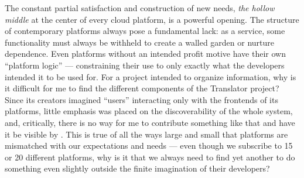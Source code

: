 The constant partial satisfaction and construction of new needs,
\emph{the hollow middle} at the center of every cloud platform, is a
powerful opening. The structure of contemporary platforms always pose a
fundamental lack: as a service, some functionality must always be withheld
to create a walled garden or nurture dependence. Even platforms without
an intended profit motive have their own ``platform logic'' ---
constraining their use to only exactly what the developers intended it
to be used for. For a project intended to organize information, why is
it difficult for me to find the different components of the Translator
project? Since its creators imagined ``users'' interacting only with the
frontends of its platforms, little emphasis was placed on the
discoverability of the whole system, and, critically, there is no way
for me to contribute something like that and have it be visible by .
This is true of all the ways large and small that platforms are
mismatched with our expectations and needs --- even though we subscribe
to 15 or 20 different platforms, why is it that we always need to find
yet another to do something even slightly outside the finite imagination
of their developers?

